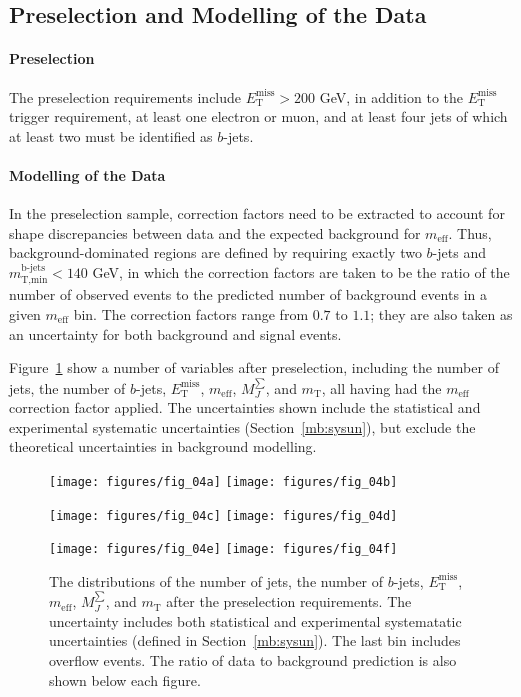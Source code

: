 \subsection{Preselection and Modelling of the Data}\label{mb:pres}

\paragraph{Preselection} The preselection requirements include
$E_{\text{T}}^{\text{miss}} > 200$ GeV, in addition to the
$E_{\text{T}}^{\text{miss}}$ trigger requirement, at least one electron or
muon, and at least four jets of which at least two must be identified as
$b$-jets.

\paragraph{Modelling of the Data} In the preselection sample, correction
factors need to be extracted to account for shape discrepancies between data
and the expected background for $m_{\text{eff}}$. Thus, background-dominated
regions are defined by requiring exactly two $b$-jets and
$m_{\text{T,min}}^{\text{b-jets}} < 140$ GeV, in which the correction factors
are taken to be the ratio of the number of observed events to the predicted
number of background events in a given $m_{\text{eff}}$ bin. The correction
factors range from $0.7$ to $1.1$; they are also taken as an uncertainty for
both background and signal events.

Figure~\ref{f:fig_04abcdef} show a number of variables after preselection,
including the number of jets, the number of $b$-jets,
$E_{\text{T}}^{\text{miss}}$, $m_{\text{eff}}$, $M_J^{\sum}$, and
$m_{\text{T}}$, all having had the $m_{\text{eff}}$ correction factor applied.
The uncertainties shown include the statistical and experimental systematic
uncertainties (Section~\ref{mb:sysun}), but exclude the theoretical
uncertainties in background modelling.

\begin{center}

	\begin{figure}[H]
		\texttt{[image: figures/fig\_04a]}
		\texttt{[image: figures/fig\_04b]}

		\texttt{[image: figures/fig\_04c]}
		\texttt{[image: figures/fig\_04d]}


		\texttt{[image: figures/fig\_04e]}
		\texttt{[image: figures/fig\_04f]}

		\caption{The distributions of the number of jets, the number of $b$-jets,
		$E_{\text{T}}^{\text{miss}}$, $m_{\text{eff}}$, $M_J^{\sum}$, and
		$m_{\text{T}}$ after the preselection requirements. The uncertainty
		includes both statistical and experimental systematatic uncertainties
		(defined in Section~\ref{mb:sysun}). The last bin includes overflow events.
		The ratio of data to background prediction is also shown below each
		figure.}

		\label{f:fig_04abcdef}

	\end{figure}

\end{center}

